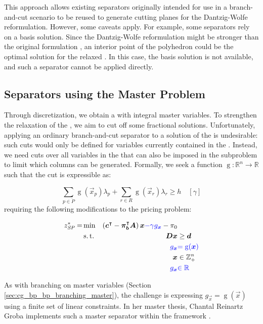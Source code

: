 This approach allows existing separators originally intended for use in a branch-and-cut scenario to be reused to generate cutting planes for the Dantzig-Wolfe reformulation. However, some caveats apply. For example, some separators rely on a basis solution. Since the Dantzig-Wolfe reformulation might be stronger than the original formulation \cite{bastubbe2018computational}, an interior point of the polyhedron could be the optimal solution for the relaxed \RMP{}. In this case, the basis solution is not available, and such a separator cannot be applied directly.

\subsection{Separators using the Master Problem}\label{sec:cg_bp_bpc_separators_master}
Through discretization, we obtain a \MP{} with integral master variables. To strengthen the \LP{} relaxation of the \MP{}, we aim to cut off some fractional solutions. Unfortunately, applying an ordinary branch-and-cut separator to a solution of the \RMP{} is undesirable: such cuts would only be defined for variables currently contained in the \RMP{}. Instead, we need cuts over all variables in the \MP{} that can also be imposed in the subproblem to limit which columns can be generated. Formally, we seek a function $\operatorname{g}: \mathbb{R}^n \to \mathbb{R}$ such that the cut is expressible as:

\begin{equation}
\sum_{p \in \ddot{P}} \operatorname{g}( \vec{x}_p ) \lambda_p + \sum_{r \in R} \operatorname{g}(  \vec{x}_r ) \lambda_r \geq h \quad \left[ \gamma \right]
\end{equation}
requiring the following modifications to the pricing problem:

\begin{equation}
\begin{aligned}
z^*_\SP{} = &\min & \left( \vec{c}\transpose - \vec{\pi}_\vec{b}\transpose \mat{A} \right) \vec{x} {\color{blue} - \gamma g_\vec{x}} - \pi_0 & \\
&\st & \mat{D} \vec{x} & \geq \vec{d} \\
&& {\color{blue} g_\vec{x}} & {\color{blue} = \operatorname{g}(\vec{x})} \\
&& \vec{x} & \in \mathbb{Z}_+^n \\
&& {\color{blue} g_\vec{x}} & {\color{blue} \in \mathbb{R}}
\end{aligned}
\end{equation}

As with branching on master variables (Section \ref{sec:cg_bp_bp_branching_master}), the challenge is expressing $g_\vec{x} = \operatorname{g}(\vec{x})$ using a finite set of linear constraints. In her master thesis, Chantal Reinartz Groba implements such a master separator within the \GCG{} framework \cite{reinartzgroba2024todo}.
